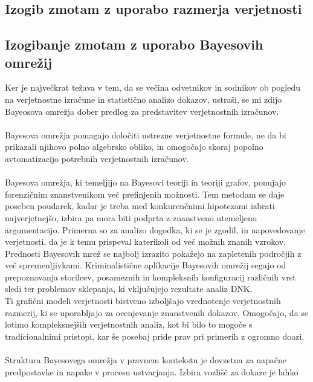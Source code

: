 \documentclass[12pt,a4paper]{amsart}
\theoremstyle{definition} %
\theoremstyle{plain} %
\begin{document}
\subsection{Izogib zmotam z uporabo razmerja verjetnosti}

\subsection{Izogibanje zmotam z uporabo Bayesovih omrežij}
Ker je največkrat težava v tem, da se večina odvetnikov in sodnikov ob pogledu na verjetnostne izračune in statistično analizo dokazov, ustraši, se mi 
zdijo Bayeosova omrežja dober predlog za predstavitev verjetnostnih izračunov. \\\\
Bayesova omrežja pomagajo določiti ustrezne verjetnostne formule, ne da bi prikazali njihovo polno algebrsko obliko, in omogočajo
skoraj popolno avtomatizacijo potrebnih verjetnostnih izračunov.\\\\
Bayesova omrežja, ki temeljijo na Bayesovi teoriji in teoriji grafov, ponujajo forenzičnim znanstvenikom več prefinjenih možnosti. Tem metodam
se daje poseben poudarek, kadar je treba med konkurenčnimi hipotezami izbrati najverjetnejšo, izbira pa mora biti podprta z znanstveno utemeljeno
argumentacijo. Primerna so za analizo dogodka, ki se je zgodil, in napovedovanje verjetnosti, da je k temu prispeval katerikoli od več možnih
znanih vzrokov. Prednosti Bayesovih mrež se najbolj izrazito pokažejo na zapletenih področjih z več spremenljivkami. Kriminalistične aplikacije
Bayesovih omrežij segajo od prepoznavanja storilcev, posameznih in kompleksnih konfiguracij različnih vrst sledi ter problemov sklepanja, ki
vključujejo rezultate analiz DNK.\\
Ti grafični modeli verjetnosti bistveno izboljšajo vrednotenje verjetnostnih razmerij, ki se uporabljajo za ocenjevanje znanstvenih dokazov.
Omogočajo, da se lotimo kompleksnejših verjetnostnih analiz, kot bi bilo to mogoče s tradicionalnimi pristopi, kar še posebaj pride prav pri primerih z ogromno doazi. \\\\
Struktura Bayesovega omrežja v pravnem kontekstu je dovzetna za napačne predpostavke in napake v procesu ustvarjanja. Izbira vozlišč za dokaze je lahko
\end{document}
